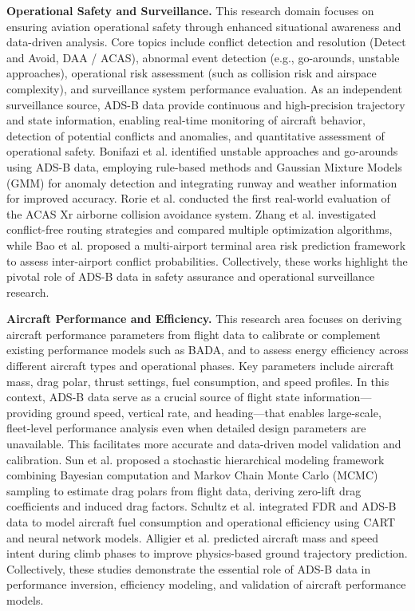 \textbf{Operational Safety and Surveillance.} 
This research domain focuses on ensuring aviation operational safety through enhanced situational awareness and data-driven analysis. Core topics include conflict detection and resolution (Detect and Avoid, DAA / ACAS), abnormal event detection (e.g., go-arounds, unstable approaches), operational risk assessment (such as collision risk and airspace complexity), and surveillance system performance evaluation. As an independent surveillance source, ADS-B data provide continuous and high-precision trajectory and state information, enabling real-time monitoring of aircraft behavior, detection of potential conflicts and anomalies, and quantitative assessment of operational safety. Bonifazi et al. \cite{bonifazi2021modeling} identified unstable approaches and go-arounds using ADS-B data, employing rule-based methods and Gaussian Mixture Models (GMM) for anomaly detection and integrating runway and weather information for improved accuracy. Rorie et al. \cite{rorie2024detect} conducted the first real-world evaluation of the ACAS Xr airborne collision avoidance system. Zhang et al. \cite{zhang2024study} investigated conflict-free routing strategies and compared multiple optimization algorithms, while Bao et al. \cite{bao2024exploring} proposed a multi-airport terminal area risk prediction framework to assess inter-airport conflict probabilities. Collectively, these works highlight the pivotal role of ADS-B data in safety assurance and operational surveillance research.

\textbf{Aircraft Performance and Efficiency.} 
This research area focuses on deriving aircraft performance parameters from flight data to calibrate or complement existing performance models such as BADA, and to assess energy efficiency across different aircraft types and operational phases. Key parameters include aircraft mass, drag polar, thrust settings, fuel consumption, and speed profiles. In this context, ADS-B data serve as a crucial source of flight state information—providing ground speed, vertical rate, and heading—that enables large-scale, fleet-level performance analysis even when detailed design parameters are unavailable. This facilitates more accurate and data-driven model validation and calibration. Sun et al. \cite{sun2018aircraft} proposed a stochastic hierarchical modeling framework combining Bayesian computation and Markov Chain Monte Carlo (MCMC) sampling to estimate drag polars from flight data, deriving zero-lift drag coefficients and induced drag factors. Schultz et al. \cite{schultz2022data} integrated FDR and ADS-B data to model aircraft fuel consumption and operational efficiency using CART and neural network models. Alligier et al. \cite{alligier2020predictive} predicted aircraft mass and speed intent during climb phases to improve physics-based ground trajectory prediction. Collectively, these studies demonstrate the essential role of ADS-B data in performance inversion, efficiency modeling, and validation of aircraft performance models.

